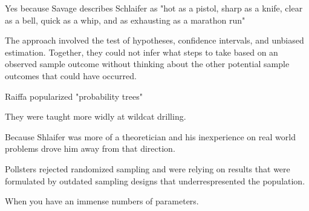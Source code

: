 \documentclass[12pt]{article}
\begin{document}

\begin{enumerate}


Yes because Savage describes Schlaifer as "hot as a pistol, sharp as a knife, clear as a bell, quick as a whip, and as exhausting as a marathon run"


The approach involved the test of hypotheses, confidence intervals, and unbiased estimation. Together, they could not infer what steps to take based on an observed 
sample outcome without thinking about the other potential sample outcomes that could have occurred. 


Raiffa popularized "probability trees" 


They were taught more widly at wildcat drilling.


Because Shlaifer was more of a theoretician and his inexperience on real world problems drove him away from that direction.


Pollsters rejected randomized sampling and were relying on results that were formulated by outdated sampling designs that underrespresented the population. 


When you have an immense numbers of parameters. 



\end{enumerate}
\end{document}
